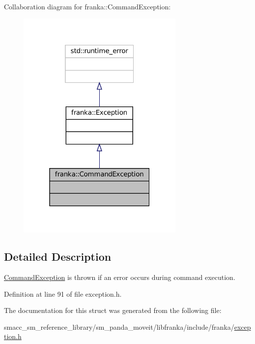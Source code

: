 Collaboration diagram for franka\+:\+:Command\+Exception\+:
\nopagebreak
\begin{figure}[H]
\begin{center}
\leavevmode
\includegraphics[width=232pt]{structfranka_1_1CommandException__coll__graph}
\end{center}
\end{figure}


\subsection{Detailed Description}
\hyperlink{structfranka_1_1CommandException}{Command\+Exception} is thrown if an error occurs during command execution. 

Definition at line 91 of file exception.\+h.



The documentation for this struct was generated from the following file\+:\begin{DoxyCompactItemize}
\item 
smacc\+\_\+sm\+\_\+reference\+\_\+library/sm\+\_\+panda\+\_\+moveit/libfranka/include/franka/\hyperlink{exception_8h}{exception.\+h}\end{DoxyCompactItemize}
